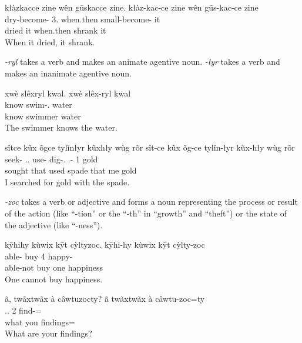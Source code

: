 \documentclass[12pt]{article}
\begin{document}
    \begin{exe}
        \ex
        kłàzkacce zine wên gūskacce zine.
        \glll
        kłàz-kac-ce zine wên gūs-kac-ce zine \\
        dry-become-\Pst{} 3\Sg{}.\Inanim{} when.then small-become-\Pst{} it \\
        dried it when.then shrank it \\
        \glt
        When it dried, it shrank.
    \end{exe}

    \textit{-ryl} takes a verb and makes an animate agentive noun.
    \textit{-łyr} takes a verb and makes an inanimate agentive noun.

    \begin{exe}
        \ex
        xwè slêxryl kwal.
        \glll
        xwè slêx-ryl kwal \\
        know swim-\Agt{}.\Anim{} water \\
        know swimmer water \\
        \glt
        The swimmer knows the water.
    \end{exe}

    \begin{exe}
        \ex
        sîtce kũx õgce tylǐnłyr kũxhły wùg rõr
        \glll
        sît-ce kũx õg-ce tylǐn-łyr kũx-hły wùg rõr \\
        seek-\Pst{} \Dem{}.\Anim{}.\Sg{} use-\Pst{} dig-\Agt{}.\Inanim{} \Dem{}.\Anim{}-\Adj{} 1\Sg{} gold \\
        sought that used spade that me gold \\
        \glt
        I searched for gold with the spade.
    \end{exe}

    \textit{-zoc} takes a verb or adjective and forms a noun
    representing the process or result of the action (like ``-tion'' or the ``-th'' in ``growth'' and ``theft'')
    or the state of the adjective (like ``-ness'').

    \begin{exe}
        \ex
        kȳhihy kùwix kȳt cỳltyzoc.
        \glll
        kȳhi-hy kùwix kȳt cỳlty-zoc \\
        able-\Neg{} buy 4\Sg{} happy-\Nmlz{} \\
        able-not buy one happiness \\
        \glt
        One cannot buy happiness.
    \end{exe}

    \begin{exe}
        \ex
        ã, twãxtwãx à câwtuzocty?
        \glll
        ã twãxtwãx à câwtu-zoc=ty \\
        \Q{} \Int{}.\Inanim{}.\Pl{} 2\Sg{} find-\Nmlz{}=\Poss{} \\
        \Q{} what you findings=\Poss{} \\
        \glt
        What are your findings?
    \end{exe}
\end{document}
